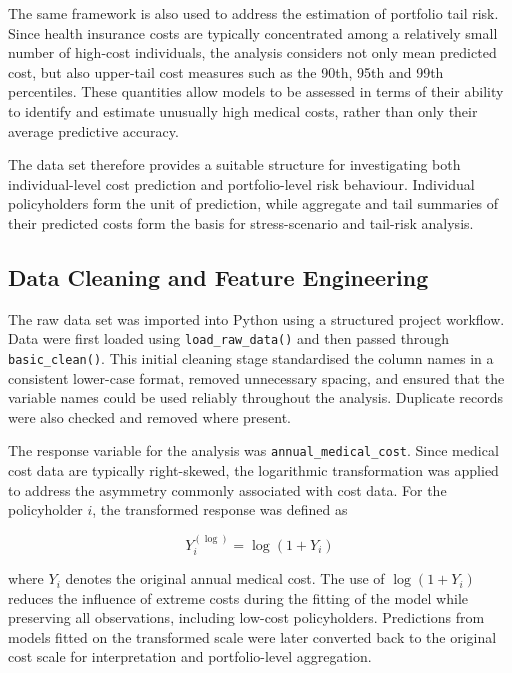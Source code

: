 	The same framework is also used to address the estimation of portfolio tail risk. Since health insurance costs are typically concentrated among a relatively small number of high-cost individuals, the analysis considers not only mean predicted cost, but also upper-tail cost measures such as the 90th, 95th and 99th percentiles. These quantities allow models to be assessed in terms of their ability to identify and estimate unusually high medical costs, rather than only their average predictive accuracy.
	
	The data set therefore provides a suitable structure for investigating both individual-level cost prediction and portfolio-level risk behaviour. Individual policyholders form the unit of prediction, while aggregate and tail summaries of their predicted costs form the basis for stress-scenario and tail-risk analysis.
	
	\subsection{Data Cleaning and Feature Engineering}
	
	The raw data set was imported into Python using a structured project workflow. Data were first loaded using \verb|load_raw_data()| and then passed through \verb|basic_clean()|. This initial cleaning stage standardised the column names in a consistent lower-case format, removed unnecessary spacing, and ensured that the variable names could be used reliably throughout the analysis. Duplicate records were also checked and removed where present.
	
	The response variable for the analysis was \verb|annual_medical_cost|. Since medical cost data are typically right-skewed, the logarithmic transformation was applied to address the asymmetry commonly associated with cost data. For the policyholder \(i\), the transformed response was defined as
	
	\begin{equation} \label{eq:3}
		Y_i^{(\log)} = \log(1 + Y_i)
	\end{equation}
	
	where \(Y_i\) denotes the original annual medical cost. The use of \(\log(1 + Y_i)\) reduces the influence of extreme costs during the fitting of the model while preserving all observations, including low-cost policyholders. Predictions from models fitted on the transformed scale were later converted back to the original cost scale for interpretation and portfolio-level aggregation.
	
